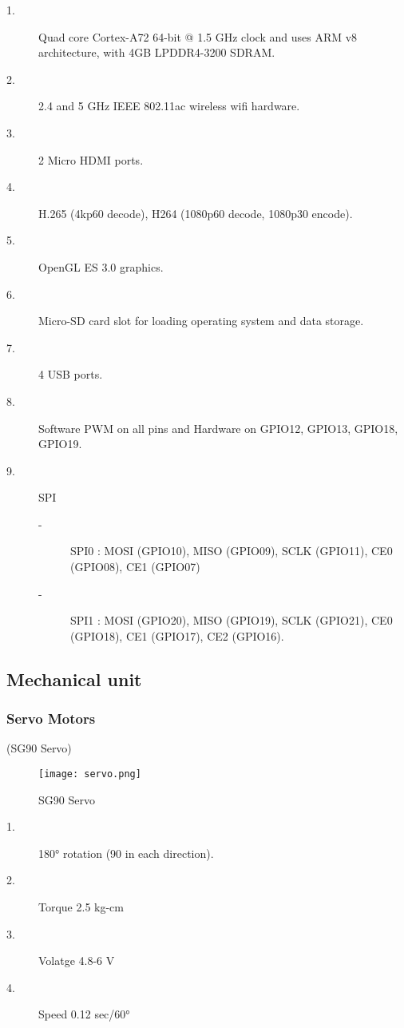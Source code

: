 \documentclass[../../../patent_v1.tex]{subfiles}
\begin{document}
\begin{description}
    \item[1.]Quad core Cortex-A72 64-bit @ 1.5 GHz clock and uses ARM v8 architecture, 
    with 4GB LPDDR4-3200 SDRAM.
    \item[2.]2.4 and 5 GHz IEEE 802.11ac wireless wifi hardware.
    \item[3.]2 Micro HDMI ports.
    \item[4.]H.265 (4kp60 decode), H264 (1080p60 decode, 1080p30 encode).
    \item[5.]OpenGL ES 3.0 graphics.
    \item[6.]Micro-SD card slot for loading operating system and data storage.
    \item[7.]4 USB ports.
    \item[8.]Software PWM on all pins and Hardware on GPIO12, GPIO13, GPIO18, GPIO19.
    \item[9.]SPI
    \begin{description}
        \item[-]SPI0 : MOSI (GPIO10), MISO (GPIO09), SCLK (GPIO11), CE0 (GPIO08), CE1 (GPIO07)
        \item[-]SPI1 : MOSI (GPIO20), MISO (GPIO19), SCLK (GPIO21), CE0 (GPIO18), CE1 (GPIO17), CE2 (GPIO16).  
    \end{description}  
\end{description}

\subsection{Mechanical unit}

\subsubsection{Servo Motors}

(SG90 Servo)

\begin{figure}[ht]
    \centering
    \texttt{[image: servo.png]}
    \caption{SG90 Servo}
\end{figure}

\FloatBarrier

\begin{description}
    \item[1.]180\si{\degree} rotation (90 in each direction).
    \item[2.]Torque 2.5 kg-cm
    \item[3.]Volatge 4.8-6 V  
    \item[4.]Speed 0.12 sec/60\si{\degree}
\end{description}
\end{document}
